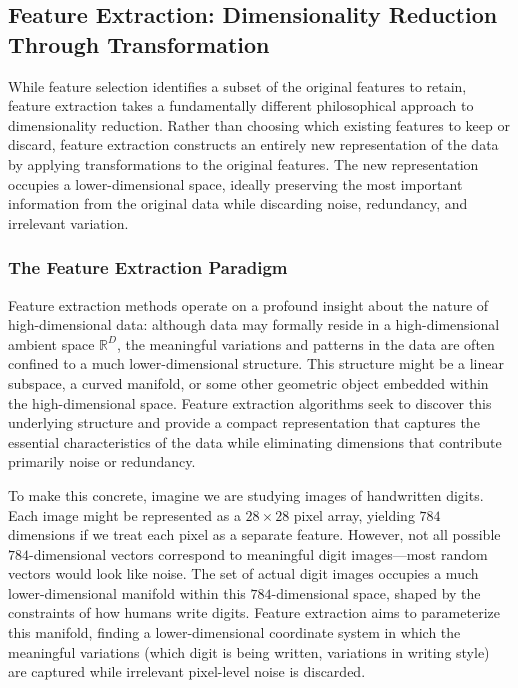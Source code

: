 \subsection*{Feature Extraction: Dimensionality Reduction Through Transformation}

While feature selection identifies a subset of the original features to retain, feature extraction takes a fundamentally different philosophical approach to dimensionality reduction. Rather than choosing which existing features to keep or discard, feature extraction constructs an entirely new representation of the data by applying transformations to the original features. The new representation occupies a lower-dimensional space, ideally preserving the most important information from the original data while discarding noise, redundancy, and irrelevant variation.

\subsubsection*{The Feature Extraction Paradigm}

Feature extraction methods operate on a profound insight about the nature of high-dimensional data: although data may formally reside in a high-dimensional ambient space $\mathbb{R}^D$, the meaningful variations and patterns in the data are often confined to a much lower-dimensional structure. This structure might be a linear subspace, a curved manifold, or some other geometric object embedded within the high-dimensional space. Feature extraction algorithms seek to discover this underlying structure and provide a compact representation that captures the essential characteristics of the data while eliminating dimensions that contribute primarily noise or redundancy.

To make this concrete, imagine we are studying images of handwritten digits. Each image might be represented as a $28 \times 28$ pixel array, yielding $784$ dimensions if we treat each pixel as a separate feature. However, not all possible $784$-dimensional vectors correspond to meaningful digit images—most random vectors would look like noise. The set of actual digit images occupies a much lower-dimensional manifold within this $784$-dimensional space, shaped by the constraints of how humans write digits. Feature extraction aims to parameterize this manifold, finding a lower-dimensional coordinate system in which the meaningful variations (which digit is being written, variations in writing style) are captured while irrelevant pixel-level noise is discarded.

